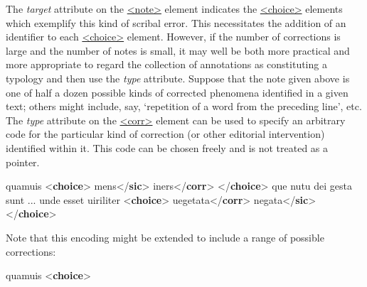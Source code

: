 The {\itshape target} attribute on the \hyperref[TEI.note]{<note>} element indicates the \hyperref[TEI.choice]{<choice>} elements which exemplify this kind of scribal error. This necessitates the addition of an identifier to each \hyperref[TEI.choice]{<choice>} element. However, if the number of corrections is large and the number of notes is small, it may well be both more practical and more appropriate to regard the collection of annotations as constituting a typology and then use the {\itshape type} attribute. Suppose that the note given above is one of half a dozen possible kinds of corrected phenomena identified in a given text; others might include, say, ‘repetition of a word from the preceding line’, etc. The {\itshape type} attribute on the \hyperref[TEI.corr]{<corr>} element can be used to specify an arbitrary code for the particular kind of correction (or other editorial intervention) identified within it. This code can be chosen freely and is not treated as a pointer. \par\bgroup{}\exampleFont \begin{shaded}\noindent\mbox{}quamuis {<\textbf{choice}>}\mbox{}\newline 
{}mens{</\textbf{sic}>}\mbox{}\newline 
{}iners{</\textbf{corr}>}\mbox{}\newline 
{</\textbf{choice}>} que nutu dei gesta sunt ... unde\mbox{}\newline 
 esset uiriliter \mbox{}\newline 
{<\textbf{choice}>}\mbox{}\newline 
{}uegetata{</\textbf{corr}>}\mbox{}\newline 
{}negata{</\textbf{sic}>}\mbox{}\newline 
{</\textbf{choice}>}\end{shaded}\egroup\par \noindent  Note that this encoding might be extended to include a range of possible corrections: \par\bgroup{}\exampleFont \begin{shaded}\noindent\mbox{}quamuis {<\textbf{choice}>}\mbox{}\newline 

\end{shaded}
